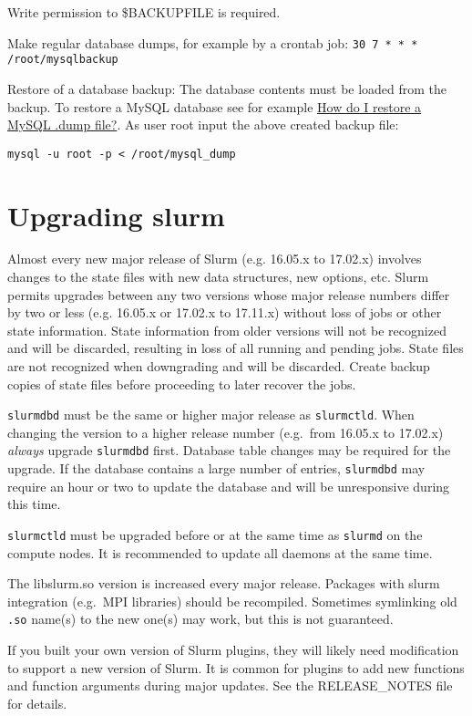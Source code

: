 Write permission to \$BACKUPFILE is required.

Make regular database dumps, for example by a crontab job:
\texttt{30 7 * * * /root/mysqlbackup}

Restore of a database backup: The database contents must be loaded from the backup. To restore a MySQL database see for example \href{http://stackoverflow.com/questions/105776/how-do-i-restore-a-mysql-dump-file}{How do I restore a MySQL .dump file?}. As user root input the above created backup file:

\texttt{mysql -u root -p < /root/mysql\_dump}

\section{Upgrading slurm} \label{sec:slurmupgrade}

Almost every new major release of Slurm (e.g. 16.05.x to 17.02.x) involves changes to the state files with new data structures, new options, etc. Slurm permits upgrades between any two versions whose major release numbers differ by two or less (e.g. 16.05.x or 17.02.x to 17.11.x) without loss of jobs or other state information. State information from older versions will not be recognized and will be discarded, resulting in loss of all running and pending jobs. State files are not recognized when downgrading and will be discarded. Create backup copies of state files before proceeding to later recover the jobs.

\texttt{slurmdbd} must be the same or higher major release as \texttt{slurmctld}. When changing the version to a higher release number (e.g.\ from 16.05.x to 17.02.x) \emph{always} upgrade \texttt{slurmdbd} first. Database table changes may be required for the upgrade. If the database contains a large number of entries, \texttt{slurmdbd} may require an hour or two to update the database and will be unresponsive during this time.

\texttt{slurmctld} must be upgraded before or at the same time as \texttt{slurmd} on the compute nodes. It is recommended to update all daemons at the same time.

The libslurm.so version is increased every major release. Packages with slurm integration (e.g.\ MPI libraries) should be recompiled. Sometimes symlinking old \texttt{.so} name(s) to the new one(s) may work, but this is not guaranteed.

If you built your own version of Slurm plugins, they will likely need modification to support a new version of Slurm. It is common for plugins to add new functions and function arguments during major updates. See the RELEASE\_NOTES file for details.

